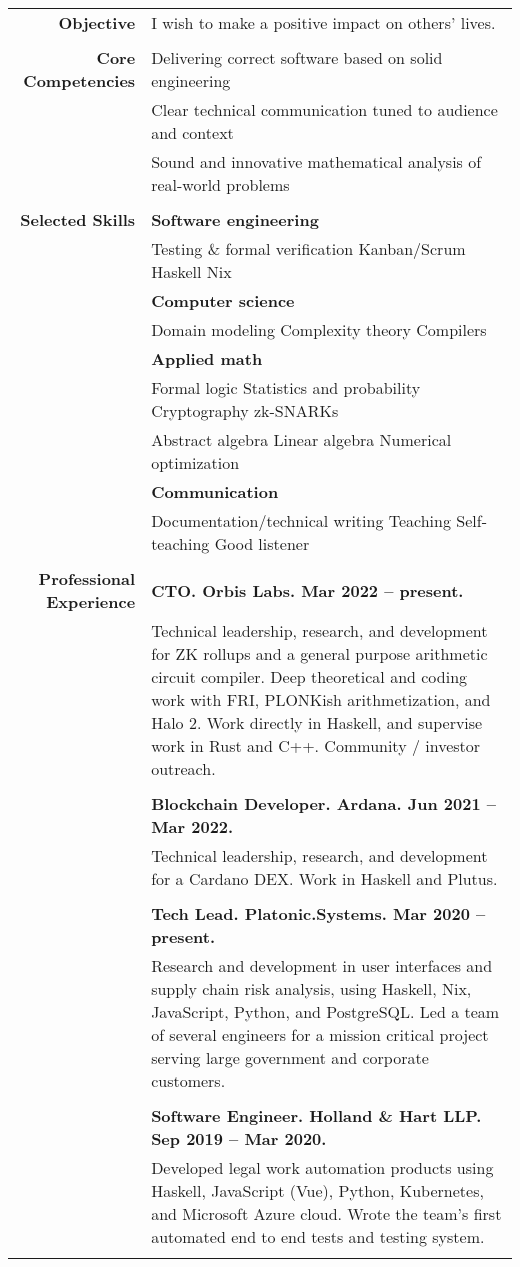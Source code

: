 \documentclass{article}
\newcommand\spc{\hspace{8pt}}
\begin{document}
\bgroup
\begin{tabular}{rl}
  \def\arraystrech{1.5}
  {\bf Objective} & I wish to make a positive impact on others' lives. \\ \\
  {\bf Core Competencies} & Delivering correct software based on solid engineering \\
   & Clear technical communication tuned to audience and context \\
  & Sound and innovative mathematical analysis of real-world problems \\ \\

  {\bf Selected Skills}  & {\bf Software engineering} \\
	& Testing \& formal verification \spc Kanban/Scrum \spc Haskell \spc Nix \\
  & {\bf Computer science} \\
  & Domain modeling \spc Complexity theory \spc Compilers \\
  & {\bf Applied math} \\
  & Formal logic \spc Statistics and probability \spc Cryptography \spc zk-SNARKs \\
  & Abstract algebra \spc Linear algebra \spc Numerical optimization \\
  & {\bf Communication} \\
  & Documentation/technical writing \spc Teaching \spc Self-teaching \spc Good listener \\ \\

  {\bf Professional Experience} 
  & {\bf CTO. Orbis Labs. Mar 2022 -- present.} \\
  & \parbox{4.5in}{Technical leadership, research, and development for ZK rollups and a general purpose arithmetic circuit compiler. Deep theoretical and coding work with FRI, PLONKish arithmetization, and Halo 2. Work directly in Haskell, and supervise work in Rust and C++. Community / investor outreach.} \\ \\
  & {\bf Blockchain Developer. Ardana. Jun 2021 -- Mar 2022.} \\
  & \parbox{4.5in}{Technical leadership, research, and development for a Cardano DEX. Work in Haskell and Plutus.} \\ \\
  & {\bf Tech Lead. Platonic.Systems. Mar 2020 -- present.}\\
  & \parbox{4.5in}{Research and development in user interfaces and supply chain risk analysis, using Haskell, Nix, JavaScript, Python, and PostgreSQL. Led a team of several engineers for a mission critical project serving large government and corporate customers.} \\ \\
  & {\bf Software Engineer. Holland \& Hart LLP. Sep 2019 -- Mar 2020.} \\
  & \parbox{4.5in}{Developed legal work automation products using Haskell, JavaScript (Vue), Python, Kubernetes, and Microsoft Azure cloud. Wrote the team's first automated end to end tests and testing system.} \\ \\


\end{tabular}
\end{document}
